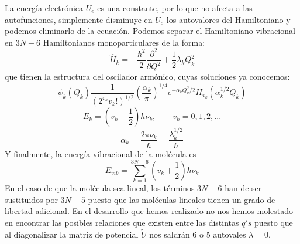 \documentclass[a4paper]{article}
\begin{document}
La energía electrónica $U_e$ es una constante, por lo que no afecta a las autofunciones, simplemente disminuye en $U_e$ los autovalores del Hamiltoniano y podemos eliminarlo de la ecuación. Podemos separar el Hamiltoniano vibracional en $3N-6$ Hamiltonianos monoparticulares de la forma:
\begin{equation}
\hat H_k = -\frac{\hbar^2}{2}\frac{\partial^2}{\partial Q^2}+\frac{1}{2}\lambda_kQ_k^2
\end{equation}
que tienen la estructura del oscilador armónico, cuyas soluciones ya conocemos:
\begin{equation}
\psi_k(Q_k)\frac{1}{\left(2^{v_k}v_k!\right)^{1/2}}\left(\frac{\alpha_k}{\pi}\right)^{1/4}e^{-\alpha_kQ^2_k/2}H_{v_k}(\alpha_k^{1/2}Q_k)
\end{equation}
\begin{equation}
E_k=\left(v_k+\frac{1}{2}\right)h\nu_k,	\qquad v_k=0,1,2,...
\end{equation}
\begin{equation}
\alpha_k=\frac{2\pi\nu_k}{\hbar}=\frac{\lambda_k^{1/2}}{\hbar}
\end{equation}
Y finalmente, la energía vibracional de la molécula es
\begin{equation}
E_{vib}=\sum_{k=1}^{3N-6}\left(v_k+\frac{1}{2}\right)h\nu_k
\end{equation}
En el caso de que la molécula sea lineal, los términos $3N-6$ han de ser sustituidos por $3N-5$ puesto que las moléculas lineales tienen un grado de libertad adicional.
En el desarrollo que hemos realizado no nos hemos molestado en encontrar las posibles relaciones que existen entre las distintas $q's$ puesto que al diagonalizar la matriz de potencial $\tilde U$ nos saldrán 6 o 5 autovales $\lambda = 0$.
\end{document}
